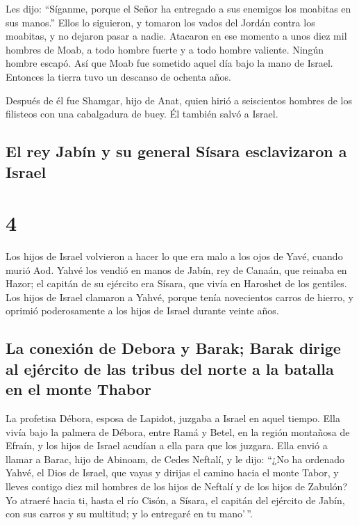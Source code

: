  Les dijo: ``Síganme, porque el Señor ha entregado a sus
enemigos los moabitas en sus manos.'' Ellos lo siguieron, y tomaron los
vados del Jordán contra los moabitas, y no dejaron pasar a nadie.
 Atacaron en ese momento a unos diez mil hombres de Moab,
a todo hombre fuerte y a todo hombre valiente. Ningún hombre escapó.
 Así que Moab fue sometido aquel día bajo la mano de
Israel. Entonces la tierra tuvo un descanso de ochenta años.

 Después de él fue Shamgar, hijo de Anat, quien hirió a
seiscientos hombres de los filisteos con una cabalgadura de buey. Él
también salvó a Israel.

\hypertarget{el-rey-jabuxedn-y-su-general-suxedsara-esclavizaron-a-israel}{%
\subsection{El rey Jabín y su general Sísara esclavizaron a
Israel}\label{el-rey-jabuxedn-y-su-general-suxedsara-esclavizaron-a-israel}}

\hypertarget{section-3}{%
\section{4}\label{section-3}}

 Los hijos de Israel volvieron a hacer lo que era malo a
los ojos de Yavé, cuando murió Aod.  Yahvé los vendió en
manos de Jabín, rey de Canaán, que reinaba en Hazor; el capitán de su
ejército era Sísara, que vivía en Haroshet de los gentiles.
 Los hijos de Israel clamaron a Yahvé, porque tenía
novecientos carros de hierro, y oprimió poderosamente a los hijos de
Israel durante veinte años.

\hypertarget{la-conexiuxf3n-de-debora-y-barak-barak-dirige-al-ejuxe9rcito-de-las-tribus-del-norte-a-la-batalla-en-el-monte-thabor}{%
\subsection{La conexión de Debora y Barak; Barak dirige al ejército de
las tribus del norte a la batalla en el monte
Thabor}\label{la-conexiuxf3n-de-debora-y-barak-barak-dirige-al-ejuxe9rcito-de-las-tribus-del-norte-a-la-batalla-en-el-monte-thabor}}

 La profetisa Débora, esposa de Lapidot, juzgaba a Israel
en aquel tiempo.  Ella vivía bajo la palmera de Débora,
entre Ramá y Betel, en la región montañosa de Efraín, y los hijos de
Israel acudían a ella para que los juzgara.  Ella envió a
llamar a Barac, hijo de Abinoam, de Cedes Neftalí, y le dijo: ``¿No ha
ordenado Yahvé, el Dios de Israel, que vayas y dirijas el camino hacia
el monte Tabor, y lleves contigo diez mil hombres de los hijos de
Neftalí y de los hijos de Zabulón?  Yo atraeré hacia ti,
hasta el río Cisón, a Sísara, el capitán del ejército de Jabín, con sus
carros y su multitud; y lo entregaré en tu mano'\,''.

